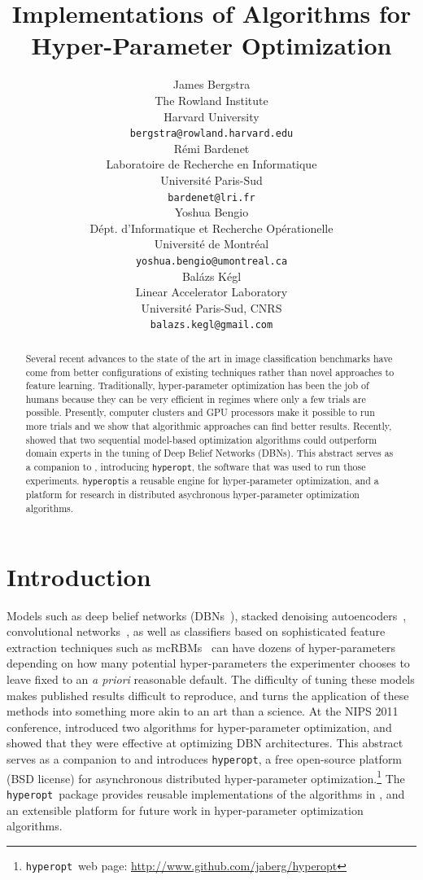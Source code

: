 \documentclass{article}
\title{Implementations of Algorithms for Hyper-Parameter Optimization}
\author{
James Bergstra\\ %
The Rowland Institute\\
Harvard University\\
\texttt{bergstra@rowland.harvard.edu} \\
\And
R{\'e}mi Bardenet \\
Laboratoire de Recherche en Informatique\\
Universit{\'e} Paris-Sud \\
\texttt{bardenet@lri.fr} \\
\AND
Yoshua Bengio \\
D{\'e}pt. d'Informatique et Recherche Op{\'e}rationelle \\
Universit{\'e} de Montr{\'e}al\\
\texttt{yoshua.bengio@umontreal.ca} \\
\And
Bal{\'a}zs K{\'e}gl \\
Linear Accelerator Laboratory \\
Universit{\'e} Paris-Sud, CNRS \\
\texttt{balazs.kegl@gmail.com}
}
\newcommand{\vs}[1]{\vspace*{-#1mm}}
\newcommand{\Bs}{\vs{2}}
\newcommand{\as}{\vs{1}}
\renewcommand{\citet}{\cite}
\newcommand{\hyperopt}{{\tt hyperopt}}
\begin{document}
\maketitle
\begin{abstract}
\vs{2}
    Several recent advances to the state of the art in image classification benchmarks have come
    from better configurations of existing techniques rather than novel approaches to
    feature learning.
    Traditionally,
    hyper-parameter optimization has been the job of humans because they can be very efficient in regimes where only a few trials are possible.
    Presently, computer clusters and GPU processors make it possible to run more trials
    and we show that algorithmic approaches can find better results.
    Recently, \cite{nipspaper} showed that
    two sequential model-based optimization algorithms
    could outperform domain experts in the tuning of 
    Deep Belief Networks (DBNs).
    This abstract serves as a companion to \cite{nipspaper},
    introducing \hyperopt, the software
    that was used to run those experiments.
    \hyperopt is a reusable engine for hyper-parameter optimization, and a platform for research in distributed asychronous hyper-parameter optimization algorithms.
\vs{3}
\end{abstract}

\Bs
\section{Introduction}
\as

Models such as deep belief networks (DBNs~\citep{hinton+osindero+teh:2006}),
stacked denoising autoencoders~\citep{vincent+larochelle+lajoie+bengio+manzagol:2010},
convolutional networks~\citep{lecun+bottou+bengio+haffner:1998},
as well as classifiers based on sophisticated feature extraction techniques such as
mcRBMs~\citep{ranzato+hinton:2010}
can have dozens of hyper-parameters depending on how many
potential hyper-parameters the experimenter chooses to leave fixed to an {\it a priori} reasonable default.
The difficulty of tuning these models makes published results difficult to
reproduce, and turns the application of these methods into something more akin
to an art than a science.
At the NIPS 2011 conference, \citet{nipspaper} introduced
two algorithms for hyper-parameter optimization, and showed that they were effective
at optimizing DBN architectures.
This abstract serves as a companion to \citet{nipspaper}
and introduces \hyperopt, a free open-source platform (BSD license) for
asynchronous distributed hyper-parameter optimization.\footnote{
\hyperopt\ web page: \url{http://www.github.com/jaberg/hyperopt}}
The \hyperopt\ package provides reusable implementations of the algorithms in \citet{nipspaper}, and an extensible platform for future work in hyper-parameter optimization algorithms.
\end{document}
